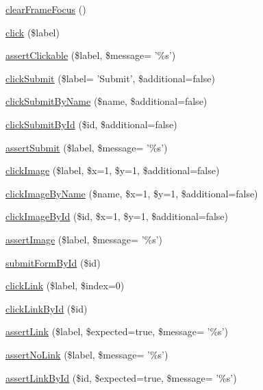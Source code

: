 \begin{DoxyCompactItemize}
\item 
\hyperlink{class_web_test_case_ae38524c59375b3e28ad37b35be923b1d}{clearFrameFocus} ()
\item 
\hyperlink{class_web_test_case_a55d9b7671e27cb63d19107722628bd8e}{click} (\$label)
\item 
\hyperlink{class_web_test_case_ac2a2523df882dcad5f6191b9d6386d4a}{assertClickable} (\$label, \$message= '\%s')
\item 
\hyperlink{class_web_test_case_a7c7a1adc6ce99397bda5914edca76eaf}{clickSubmit} (\$label= 'Submit', \$additional=false)
\item 
\hyperlink{class_web_test_case_ad23d94f7be9a92d07c36772b302cd495}{clickSubmitByName} (\$name, \$additional=false)
\item 
\hyperlink{class_web_test_case_a8de6c0c32b24d21b3d077487acbf4237}{clickSubmitById} (\$id, \$additional=false)
\item 
\hyperlink{class_web_test_case_a56874c6913a45fe55a581128a1e956e4}{assertSubmit} (\$label, \$message= '\%s')
\item 
\hyperlink{class_web_test_case_a235d36a855726467258fd896f724f1c9}{clickImage} (\$label, \$x=1, \$y=1, \$additional=false)
\item 
\hyperlink{class_web_test_case_a5b555b4f2c9013abcf3b3893a3447607}{clickImageByName} (\$name, \$x=1, \$y=1, \$additional=false)
\item 
\hyperlink{class_web_test_case_aa470415b0fc11df87ce6e5d2ea5a5644}{clickImageById} (\$id, \$x=1, \$y=1, \$additional=false)
\item 
\hyperlink{class_web_test_case_a657a5b3135189f9e9db563a76dce9329}{assertImage} (\$label, \$message= '\%s')
\item 
\hyperlink{class_web_test_case_addbc36aa63cbd70458383bc2fae78c03}{submitFormById} (\$id)
\item 
\hyperlink{class_web_test_case_a286ade62f142d1ac0b5d0bc9038a01cf}{clickLink} (\$label, \$index=0)
\item 
\hyperlink{class_web_test_case_ac87eaa5a61ab4ba0fe12deab4ddc97e2}{clickLinkById} (\$id)
\item 
\hyperlink{class_web_test_case_ae44bbb204f6496039507a06361f05431}{assertLink} (\$label, \$expected=true, \$message= '\%s')
\item 
\hyperlink{class_web_test_case_a317931c404b513787a96c801f852d01f}{assertNoLink} (\$label, \$message= '\%s')
\item 
\hyperlink{class_web_test_case_ab2edabae7160d6b9646de3c366b7c640}{assertLinkById} (\$id, \$expected=true, \$message= '\%s')

\end{DoxyCompactItemize}
